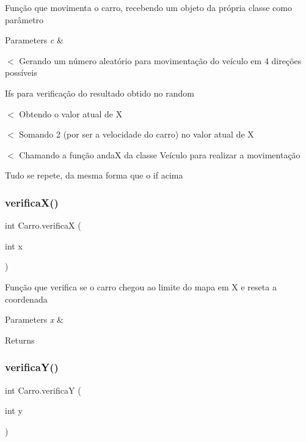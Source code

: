 Função que movimenta o carro, recebendo um objeto da própria classe como parâmetro 
\begin{DoxyParams}{Parameters}
{\em c} & \\
\hline
\end{DoxyParams}
$<$ Gerando um número aleatório para movimentação do veículo em 4 direções possíveis

Ifs para verificação do resultado obtido no random

$<$ Obtendo o valor atual de X

$<$ Somando 2 (por ser a velocidade do carro) no valor atual de X

$<$ Chamando a função andaX da classe Veículo para realizar a movimentação

Tudo se repete, da mesma forma que o if acima\mbox{\label{classCarro_add3f779cbff4f49e42bd073eaca2451a}} 
\subsubsection{\texorpdfstring{verifica\+X()}{verificaX()}}
{\footnotesize\ttfamily int Carro.\+verificaX (\begin{DoxyParamCaption}\item[{int}]{x }\end{DoxyParamCaption})\hspace{0.3cm}{\ttfamily [inline]}}

Função que verifica se o carro chegou ao limite do mapa em X e reseta a coordenada 
\begin{DoxyParams}{Parameters}
{\em x} & \\
\hline
\end{DoxyParams}
\begin{DoxyReturn}{Returns}

\end{DoxyReturn}
\mbox{\label{classCarro_aefac90e7ced5a09323c9114fc2905dd6}} 
\subsubsection{\texorpdfstring{verifica\+Y()}{verificaY()}}
{\footnotesize\ttfamily int Carro.\+verificaY (\begin{DoxyParamCaption}\item[{int}]{y }\end{DoxyParamCaption})\hspace{0.3cm}{\ttfamily [inline]}}

